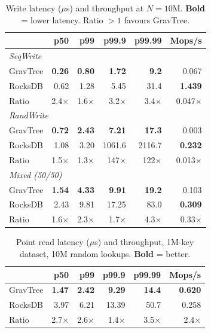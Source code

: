 \documentclass{jors}
\begin{document}
\begin{table}[t]
\centering
\footnotesize
\caption{Write latency ($\mu$s) and throughput at $N = 10$M.
\textbf{Bold} = lower latency. Ratio $>1$ favours GravTree.}
\label{tab:write}
\begin{tabular}{lrrrrr}
\toprule
 & p50 & p99 & p99.9 & p99.99 & Mops/s \\
\midrule
\multicolumn{6}{l}{\textit{SeqWrite}} \\
GravTree & \textbf{0.26} & \textbf{0.80} & \textbf{1.72} & \textbf{9.2} & 0.067 \\
RocksDB  & 0.62 & 1.28 & 5.45 & 31.4 & \textbf{1.439} \\
Ratio    & 2.4$\times$ & 1.6$\times$ & 3.2$\times$ & 3.4$\times$ & 0.047$\times$ \\
\midrule
\multicolumn{6}{l}{\textit{RandWrite}} \\
GravTree & \textbf{0.72} & \textbf{2.43} & \textbf{7.21} & \textbf{17.3} & 0.003 \\
RocksDB  & 1.08 & 3.20 & 1061.6 & 2116.7 & \textbf{0.232} \\
Ratio    & 1.5$\times$ & 1.3$\times$ & 147$\times$ & 122$\times$ & 0.013$\times$ \\
\midrule
\multicolumn{6}{l}{\textit{Mixed (50/50)}} \\
GravTree & \textbf{1.54} & \textbf{4.33} & \textbf{9.91} & \textbf{19.2} & 0.103 \\
RocksDB  & 2.43 & 9.81 & 17.25 & 83.0 & \textbf{0.309} \\
Ratio    & 1.6$\times$ & 2.3$\times$ & 1.7$\times$ & 4.3$\times$ & 0.33$\times$ \\
\bottomrule
\end{tabular}
\end{table}

\begin{table}[t]
\centering
\small
\caption{Point read latency ($\mu$s) and throughput, 1M-key dataset,
10M random lookups. \textbf{Bold} = better.}
\label{tab:read}
\begin{tabular}{lrrrrr}
\toprule
 & p50 & p99 & p99.9 & p99.99 & Mops/s \\
\midrule
GravTree & \textbf{1.47} & \textbf{2.42} & \textbf{9.29} & \textbf{14.4} & \textbf{0.620} \\
RocksDB  & 3.97 & 6.21 & 13.39 & 50.7 & 0.258 \\
Ratio    & 2.7$\times$ & 2.6$\times$ & 1.4$\times$ & 3.5$\times$ & 2.4$\times$ \\
\bottomrule
\end{tabular}
\end{table}
\end{document}
